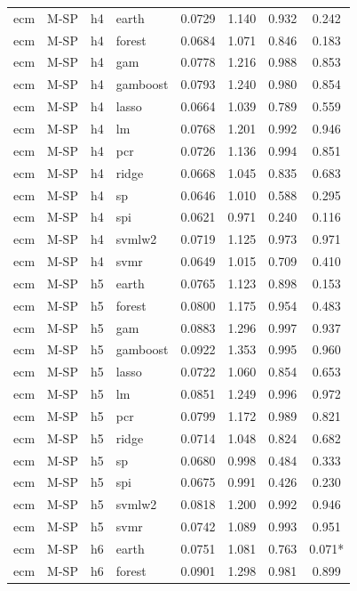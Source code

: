\begin{ThreePartTable}
\begin{longtable}[t]{llclcccc}
\addlinespace
ecm & M-SP & h4 & earth & 0.0729 & 1.140 & 0.932 & 0.242\\
ecm & M-SP & h4 & forest & 0.0684 & 1.071 & 0.846 & 0.183\\
ecm & M-SP & h4 & gam & 0.0778 & 1.216 & 0.988 & 0.853\\
ecm & M-SP & h4 & gamboost & 0.0793 & 1.240 & 0.980 & 0.854\\
ecm & M-SP & h4 & lasso & 0.0664 & 1.039 & 0.789 & 0.559\\
ecm & M-SP & h4 & lm & 0.0768 & 1.201 & 0.992 & 0.946\\
ecm & M-SP & h4 & pcr & 0.0726 & 1.136 & 0.994 & 0.851\\
ecm & M-SP & h4 & ridge & 0.0668 & 1.045 & 0.835 & 0.683\\
ecm & M-SP & h4 & sp & 0.0646 & 1.010 & 0.588 & 0.295\\
ecm & M-SP & h4 & spi & 0.0621 & 0.971 & 0.240 & 0.116\\
ecm & M-SP & h4 & svmlw2 & 0.0719 & 1.125 & 0.973 & 0.971\\
ecm & M-SP & h4 & svmr & 0.0649 & 1.015 & 0.709 & 0.410\\
\addlinespace
ecm & M-SP & h5 & earth & 0.0765 & 1.123 & 0.898 & 0.153\\
ecm & M-SP & h5 & forest & 0.0800 & 1.175 & 0.954 & 0.483\\
ecm & M-SP & h5 & gam & 0.0883 & 1.296 & 0.997 & 0.937\\
ecm & M-SP & h5 & gamboost & 0.0922 & 1.353 & 0.995 & 0.960\\
ecm & M-SP & h5 & lasso & 0.0722 & 1.060 & 0.854 & 0.653\\
ecm & M-SP & h5 & lm & 0.0851 & 1.249 & 0.996 & 0.972\\
ecm & M-SP & h5 & pcr & 0.0799 & 1.172 & 0.989 & 0.821\\
ecm & M-SP & h5 & ridge & 0.0714 & 1.048 & 0.824 & 0.682\\
ecm & M-SP & h5 & sp & 0.0680 & 0.998 & 0.484 & 0.333\\
ecm & M-SP & h5 & spi & 0.0675 & 0.991 & 0.426 & 0.230\\
ecm & M-SP & h5 & svmlw2 & 0.0818 & 1.200 & 0.992 & 0.946\\
ecm & M-SP & h5 & svmr & 0.0742 & 1.089 & 0.993 & 0.951\\
\addlinespace
ecm & M-SP & h6 & earth & 0.0751 & 1.081 & 0.763 & 0.071*\\
ecm & M-SP & h6 & forest & 0.0901 & 1.298 & 0.981 & 0.899\\

\end{longtable}
\end{ThreePartTable}
